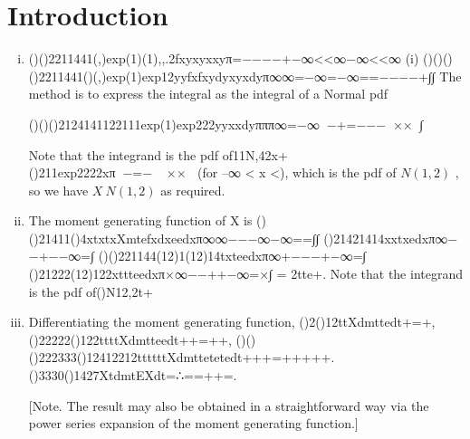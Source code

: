 \documentclass{article}
\begin{document}
\section{Introduction}
\begin{enumerate}[(i)]
\item 

()()2211441(,)exp(1)(1),,.2fxyxyxxyπ=−−−−+−∞<<∞−∞<<∞
(i) ()()()()2211441()(,)exp(1)exp12yyfxfxydyxyxdyπ∞∞=−∞=−∞==−−−−+∫∫
The method is to express the integral
as the integral of a Normal pdf

()()()2124141122111exp(1)exp222yyxxdyπππ∞=−∞−+=−−−××∫

Note that the integrand is
the pdf of11N,42x+
()211exp2222xπ−=−×× (for –∞ < x <\infty),
which is the pdf of $N(1, 2)$
, so we have $X ~ N(1, 2)$ as required.
\item The moment generating function of X is
()()21411()4xtxtxXmtefxdxeedxπ∞∞−−−∞−∞==∫∫
()21421414xxtxedxπ∞−−+−−∞=∫
()()221144(12)1(12)14txteedxπ∞+−−−+−∞=∫
()21222(12)122xttteedxπ×∞−−++−∞=×∫ = 2tte+.
Note that the integrand is
the pdf of()N12,2t+

\item Differentiating the moment generating function,
()2()12ttXdmttedt+=+,
()22222()122ttttXdmtteedt++=++,
()()()222333()12412212ttttttXdmttetetedt+++=+++++.
()3330()1427XtdmtEXdt=∴==++=.

[Note. The result may also be obtained in a straightforward way via the power series expansion of the moment generating function.]
\end{enumerate}
\end{document}
